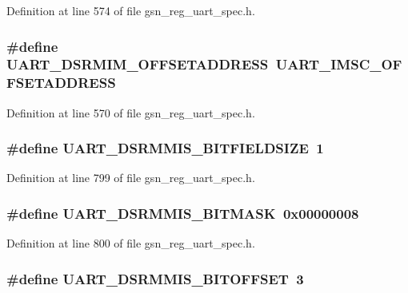 Definition at line 574 of file gsn\_\-reg\_\-uart\_\-spec.h.

\hypertarget{a00575_a77c7da0c4325657e15bc667bd71d14d5}{
\subsubsection[{UART\_\-DSRMIM\_\-OFFSETADDRESS}]{\setlength{\rightskip}{0pt plus 5cm}\#define UART\_\-DSRMIM\_\-OFFSETADDRESS~UART\_\-IMSC\_\-OFFSETADDRESS}}
\label{a00575_a77c7da0c4325657e15bc667bd71d14d5}


Definition at line 570 of file gsn\_\-reg\_\-uart\_\-spec.h.

\hypertarget{a00575_a5ae08bad0f388223a391e4bc79917b0e}{
\subsubsection[{UART\_\-DSRMMIS\_\-BITFIELDSIZE}]{\setlength{\rightskip}{0pt plus 5cm}\#define UART\_\-DSRMMIS\_\-BITFIELDSIZE~1}}
\label{a00575_a5ae08bad0f388223a391e4bc79917b0e}


Definition at line 799 of file gsn\_\-reg\_\-uart\_\-spec.h.

\hypertarget{a00575_a76c40e15550a4cb2327edbfcf22308f8}{
\subsubsection[{UART\_\-DSRMMIS\_\-BITMASK}]{\setlength{\rightskip}{0pt plus 5cm}\#define UART\_\-DSRMMIS\_\-BITMASK~0x00000008}}
\label{a00575_a76c40e15550a4cb2327edbfcf22308f8}


Definition at line 800 of file gsn\_\-reg\_\-uart\_\-spec.h.

\hypertarget{a00575_a5725786ab76fc410d91de3a0381bb445}{
\subsubsection[{UART\_\-DSRMMIS\_\-BITOFFSET}]{\setlength{\rightskip}{0pt plus 5cm}\#define UART\_\-DSRMMIS\_\-BITOFFSET~3}}
\label{a00575_a5725786ab76fc410d91de3a0381bb445}



